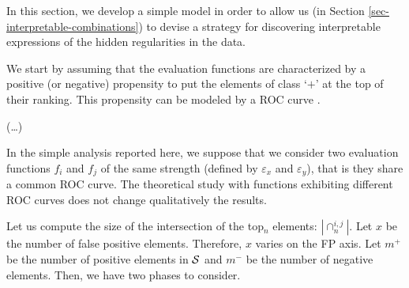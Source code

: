 \documentclass[twocolumn,english]{article}
\begin{document}
In this section, we develop a simple model in order to allow us (in Section \ref{sec-interpretable-combinations}) to devise a strategy for discovering interpretable expressions of the hidden regularities in the data. 

We start by assuming that the evaluation functions are characterized by a positive (or negative) propensity to put the elements of class `$+$' at the top of their ranking. This propensity can be modeled by a ROC curve \cite{flach2012machine}. 
 
(\ldots)

In the simple analysis reported here, we suppose that we consider two evaluation functions $f_i$ and $f_j$ of the same strength (defined by $\varepsilon_x$ and $\varepsilon_y$), that is they share a common ROC curve. The theoretical study with functions exhibiting different ROC curves does not change qualitatively the results. 

Let us compute the size of the intersection of the top$_n$ elements: $|\cap_n^{i,j}|$. Let $x$ be the number of false positive elements. Therefore, $x$ varies on the FP axis. Let $m^+$ be the number of positive elements in $\cal S$ and $m^-$ be the number of negative elements. Then, we have two phases to consider.
\end{document}
